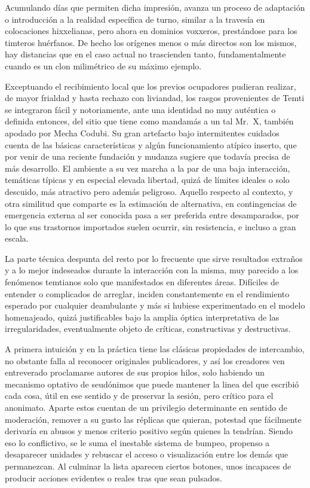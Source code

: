 \documentclass[
]{book}
\begin{document}
Acumulando días que permiten dicha impresión, avanza un proceso de adaptación o introducción a la realidad específica de turno, similar a la travesía en colocaciones hixxelianas, pero ahora en dominios voxxeros, prestándose para los timteros huérfanos. De hecho los orígenes menos o más directos son los mismos, hay distancias que en el caso actual no trascienden tanto, fundamentalmente cuando es un clon milimétrico de su máximo ejemplo.

Exceptuando el recibimiento local que los previos ocupadores pudieran realizar, de mayor frialdad y hasta rechazo con liviandad, los rasgos provenientes de Temti se integraron fácil y notoriamente, ante una identidad no muy auténtica o definida entonces, del sitio que tiene como mandamás a un tal Mr.~X, también apodado por Mecha Codubi. Su gran artefacto bajo intermitentes cuidados cuenta de las básicas características y algún funcionamiento atípico inserto, que por venir de una reciente fundación y mudanza sugiere que todavía precisa de más desarrollo. El ambiente a su vez marcha a la par de una baja interacción, temáticas típicas y en especial elevada libertad, quizá de límites ideales o solo descuido, más atractivo pero además peligroso. Aquello respecto al contexto, y otra similitud que comparte es la estimación de alternativa, en contingencias de emergencia externa al ser conocida pasa a ser preferida entre desamparados, por lo que sus trastornos importados suelen ocurrir, sin resistencia, e incluso a gran escala.

La parte técnica despunta del resto por lo frecuente que sirve resultados extraños y a lo mejor indeseados durante la interacción con la misma, muy parecido a los fenómenos temtianos solo que manifestados en diferentes áreas. Difíciles de entender o complicados de arreglar, inciden constantemente en el rendimiento esperado por cualquier deambulante y más si hubiese experimentado en el modelo homenajeado, quizá justificables bajo la amplia óptica interpretativa de las irregularidades, eventualmente objeto de críticas, constructivas y destructivas.

A primera intuición y en la práctica tiene las clásicas propiedades de intercambio, no obstante falla al reconocer originales publicadores, y así los creadores ven entreverado proclamarse autores de sus propios hilos, solo habiendo un mecanismo optativo de seudónimos que puede mantener la linea del que escribió cada cosa, útil en ese sentido y de preservar la sesión, pero crítico para el anonimato. Aparte estos cuentan de un privilegio determinante en sentido de moderación, remover a su gusto las réplicas que quieran, potestad que fácilmente derivaría en abusos y menos criterio positivo según quienes la tendrían. Siendo eso lo conflictivo, se le suma el inestable sistema de bumpeo, propenso a desaparecer unidades y rebuscar el acceso o visualización entre los demás que permanezcan. Al culminar la lista aparecen ciertos botones, unos incapaces de producir acciones evidentes o reales tras que sean pulsados.
\end{document}
